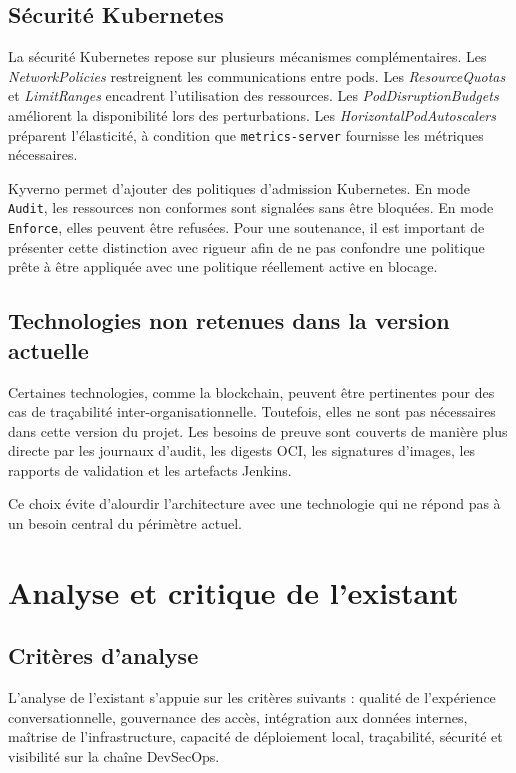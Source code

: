 \subsection{Sécurité Kubernetes}

La sécurité Kubernetes repose sur plusieurs mécanismes complémentaires. Les \textit{NetworkPolicies} restreignent les communications entre pods. Les \textit{ResourceQuotas} et \textit{LimitRanges} encadrent l'utilisation des ressources. Les \textit{PodDisruptionBudgets} améliorent la disponibilité lors des perturbations. Les \textit{HorizontalPodAutoscalers} préparent l'élasticité, à condition que \texttt{metrics-server} fournisse les métriques nécessaires.

Kyverno permet d'ajouter des politiques d'admission Kubernetes. En mode \texttt{Audit}, les ressources non conformes sont signalées sans être bloquées. En mode \texttt{Enforce}, elles peuvent être refusées. Pour une soutenance, il est important de présenter cette distinction avec rigueur afin de ne pas confondre une politique prête à être appliquée avec une politique réellement active en blocage.

\subsection{Technologies non retenues dans la version actuelle}

Certaines technologies, comme la blockchain, peuvent être pertinentes pour des cas de traçabilité inter-organisationnelle. Toutefois, elles ne sont pas nécessaires dans cette version du projet. Les besoins de preuve sont couverts de manière plus directe par les journaux d'audit, les digests OCI, les signatures d'images, les rapports de validation et les artefacts Jenkins.

Ce choix évite d'alourdir l'architecture avec une technologie qui ne répond pas à un besoin central du périmètre actuel.

\section{Analyse et critique de l'existant}

\subsection{Critères d'analyse}

L'analyse de l'existant s'appuie sur les critères suivants : qualité de l'expérience conversationnelle, gouvernance des accès, intégration aux données internes, maîtrise de l'infrastructure, capacité de déploiement local, traçabilité, sécurité et visibilité sur la chaîne DevSecOps.

